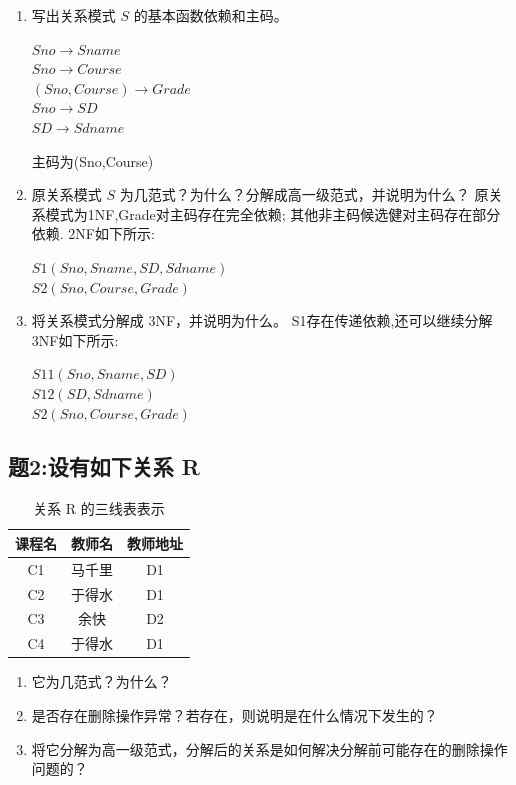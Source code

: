 \documentclass[a4paper,12pt,UTF8]{ctexart}
\begin{document}
\begin{enumerate}
  \item 写出关系模式 $S$ 的基本函数依赖和主码。
  \begin{center}
  $Sno \rightarrow Sname $\\
  $Sno \rightarrow Course$\\
  $(Sno,Course) \rightarrow Grade$\\
  $Sno \rightarrow SD$\\
  $SD \rightarrow Sdname$
  \par 主码为(Sno,Course)
  \end{center}
  \item 原关系模式 $S$ 为几范式？为什么？分解成高一级范式，并说明为什么？
  原关系模式为1NF,Grade对主码存在完全依赖;
  其他非主码候选健对主码存在部分依赖.
  2NF如下所示:\par
  \begin{center}
    
  $S1(Sno,Sname,SD,Sdname)$\\
  $S2(Sno,Course,Grade)$\\
  \end{center}
  \item 将关系模式分解成 3NF，并说明为什么。
  S1存在传递依赖,还可以继续分解
  3NF如下所示:\par
  \begin{center}
    
  $S11(Sno,Sname,SD)$\\
  $S12(SD,Sdname)$\\
  $S2(Sno,Course,Grade)$
  \end{center}
\end{enumerate}
\subsection{题2:设有如下关系 R}

\begin{table}[htbp]
    \centering
    \caption{关系 R 的三线表表示}
    \vskip 2mm
    \begin{tabular}{ccc}
        \toprule %
        \textbf{课程名} & \textbf{教师名} & \textbf{教师地址} \\ 
        \midrule %
        C1 & 马千里 & D1 \\ 
        C2 & 于得水 & D1 \\ 
        C3 & 余快 & D2 \\ 
        C4 & 于得水 & D1 \\ 
        \bottomrule %
    \end{tabular}
\end{table}

\begin{enumerate}
    \item 它为几范式？为什么？
    \item 是否存在删除操作异常？若存在，则说明是在什么情况下发生的？
    \item 将它分解为高一级范式，分解后的关系是如何解决分解前可能存在的删除操作问题的？
\end{enumerate}
\end{document}
